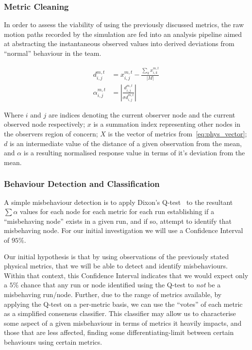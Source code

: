 \subsubsection{Metric Cleaning}
In order to assess the viability of using the previously discussed metrics, the raw motion paths recorded by the simulation are fed into an analysis pipeline aimed at abstracting the instantaneous observed values into derived deviations from ``normal'' behaviour in the team.

\begin{align}
  d_{i,j}^{m,t} &= x_{i,j}^{m,t} - \frac{\sum_k x_{i,k}^{m,t}}{|M|}\label{eq:d}\\
  \alpha_{i,j}^{m,t} &= | \frac{d_{i,j}^{m,t}}{\sigma{d_{i,j}^{m,t}}}|\label{eq:dd}
\end{align}

Where $i$ and $j$ are indices denoting the current observer node and the current observed node respectively; $x$ is a summation index representing other nodes in the observers region of concern; $X$ is the vector of metrics from~\ref{eq:phys_vector}; $d$ is an intermediate value of the distance of a given observation from the mean, and $\alpha$ is a resulting normalised response value in terms of it's deviation from the mean.

\subsubsection{Behaviour Detection and Classification}
A simple misbehaviour detection is to apply Dixon's Q-test~\cite{Dean1951} to the resultant $\sum\alpha$ values for each node for each metric for each run establishing if a ``misbehaving node'' exists in a given run, and if so, attempt to identify that misbehaving node. 
For our initial investigation we will use a Confidence Interval of $95\%$.

Our initial hypothesis is that by using observations of the previously stated physical metrics, that we will be able to detect and identify misbehaviours.
Within that context, this Confidence Interval indicates that we would expect only a $5\%$ chance that any run or node identified using the Q-test to \emph{not} be a misbehaving run/node.
Further, due to the range of metrics available, by applying the Q-test on a per-metric basis, we can use the ``votes'' of each metric as a simplified consensus classifier.
This classifier may allow us to characterise some aspect of a given misbehaviour in terms of metrics it heavily impacts, and those that are less affected, finding some differentiating-limit between certain behaviours using certain metrics.


